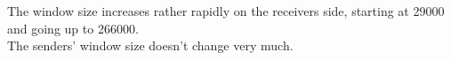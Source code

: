 The window size increases rather rapidly on the receivers side, starting at 29000 and going up to 266000. \\
The senders' window size doesn't change very much.